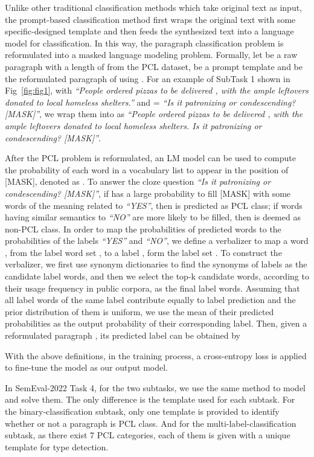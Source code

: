 \documentclass[11pt]{article}
\begin{document}
Unlike other traditional classification methods which take original text as input, the prompt-based classification method first wraps the original text with some specific-designed template and then feeds the synthesized text into a language model for classification.
In this way, the paragraph classification problem is reformulated into a masked language modeling problem.
Formally, let  be a raw paragraph with a length of  from the PCL dataset,  be a prompt template and  be the reformulated paragraph of  using .
For an example of SubTask 1 shown in Fig~\ref{fig:fig1}, with  \emph{``People  ordered pizzas to be delivered , with the ample leftovers donated to local homeless shelters.''} and  = \emph{``Is it patronizing or condescending? [MASK]''}, we wrap them into  as \emph{``People  ordered pizzas to be delivered , with the ample leftovers donated to local homeless shelters. Is it patronizing or condescending? [MASK]''}.

After the PCL problem is reformulated, an LM model  can be used to compute the probability of each word  in a vocabulary list to appear in the position of [MASK], denoted as . 
To answer the cloze question \emph{``Is it patronizing or condescending? [MASK]''}, if  has a large probability to fill [MASK] with some words of the meaning related to \emph{``YES''}, then  is predicted as PCL class; if words having similar semantics to \emph{``NO''} are more likely to be filled, then  is deemed as non-PCL class.
In order to map the probabilities of predicted words to the probabilities of the labels \emph{``YES''} and \emph{``NO''}, we define a verbalizer to map a word , from the label word set , to a label , form the label set .
To construct the verbalizer, we first use synonym dictionaries to find the synonyms of labels as the candidate label words, and then we select the top-k candidate words, according to their usage frequency in public corpora, as the final label words.
Assuming that all label words of the same label contribute equally to label prediction and the prior distribution of them is uniform, we use the mean of their predicted probabilities as the output probability of their corresponding label.
Then, given a reformulated paragraph , its predicted label  can be obtained by

With the above definitions, in the training process, a cross-entropy loss is applied to fine-tune the model  as our output model.

In SemEval-2022 Task 4, for the two subtasks, we use the same method to model and solve them.
The only difference is the template used for each subtask.
For the binary-classification subtask, only one template is provided to identify whether or not a paragraph is PCL class.
And for the multi-label-classification subtask, as there exist 7 PCL categories,  each of them is given with a unique template for type detection. 
\end{document}
